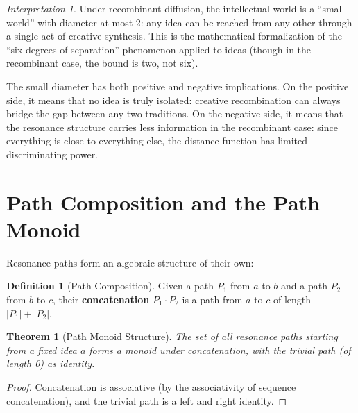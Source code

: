 \documentclass[11pt,openany]{book}
\theoremstyle{definition}
\newtheorem{definition}[axiom]{Definition}
\theoremstyle{plain}
\newtheorem{theorem}[axiom]{Theorem}
\theoremstyle{remark}
\newtheorem{interpretation}[axiom]{Interpretation}
\begin{document}
\begin{interpretation}
Under recombinant diffusion, the intellectual world is a ``small world'' with diameter at most 2: any idea can be reached from any other through a single act of creative synthesis. This is the mathematical formalization of the ``six degrees of separation'' phenomenon applied to ideas (though in the recombinant case, the bound is two, not six).

The small diameter has both positive and negative implications. On the positive side, it means that no idea is truly isolated: creative recombination can always bridge the gap between any two traditions. On the negative side, it means that the resonance structure carries less information in the recombinant case: since everything is close to everything else, the distance function has limited discriminating power.
\end{interpretation}

\section{Path Composition and the Path Monoid}

Resonance paths form an algebraic structure of their own:

\begin{definition}[Path Composition]
Given a path $P_1$ from $a$ to $b$ and a path $P_2$ from $b$ to $c$, their \textbf{concatenation} $P_1 \cdot P_2$ is a path from $a$ to $c$ of length $|P_1| + |P_2|$.
\end{definition}

\begin{theorem}[Path Monoid Structure]
The set of all resonance paths starting from a fixed idea $a$ forms a monoid under concatenation, with the trivial path (of length 0) as identity.
\end{theorem}

\begin{proof}
Concatenation is associative (by the associativity of sequence concatenation), and the trivial path is a left and right identity.
\end{proof}
\end{document}
